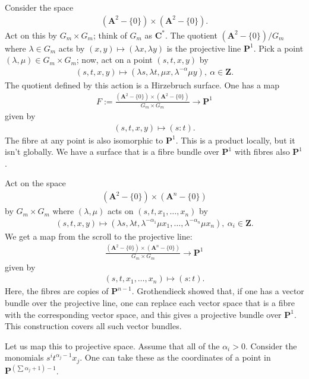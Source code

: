 \documentclass [11 pt, oneside, margin = 1 in] {article}
\begin{document}
\begin{example}\label{}\text{}
Consider the space
\begin{align*}
	(\mathbf{A}^2 - \{0\}) \times (\mathbf{A}^2 - \{0\}).
\end{align*}
Act on this by $G_m\times G_m$; think of $G_m$ as $\mathbf{C}^*$. The quotient $(\mathbf{A}^2 - \{0\})/G_m$ where $\lambda \in G_m$ acts by $(x,y)\longmapsto  (\lambda x,\lambda y)$ is the projective line $\mathbf{P}^1$. Pick a point $(\lambda,\mu)\in  G_m\times G_m$; now, act on a point $(s,t,x,y)$ by
\begin{align*}
	(s,t,x,y)\longmapsto  (\lambda s, \lambda t,\mu x,\lambda^{-\alpha}\mu y),\ \alpha\in  \mathbf{Z}.
\end{align*}
The quotient defined by this action is a Hirzebruch surface. One has a map
\begin{align*}
	F := \frac{(\mathbf{A}^2-\{0\})\times (\mathbf{A}^2-\{0\})}{G_m\times G_m} \longrightarrow \mathbf{P}^1
\end{align*}
given by
\begin{align*}
	(s,t,x,y)\longmapsto  (s:t).
\end{align*}
The fibre at any point is also isomorphic to $\mathbf{P}^1$. This is a product locally, but it isn't globally. We have a surface that is a fibre bundle over $\mathbf{P}^1$ with fibres also $\mathbf{P}^1$.
\end{example}

\begin{example}[Scroll]\label{}\text{}
Act on the space
\begin{align*}
	(\mathbf{A}^2- \{0\}) \times (\mathbf{A}^n - \{0\})
\end{align*}
by $G_m\times G_m$ where $(\lambda,\mu)$ acts on $(s,t,x_1,\hdots, x_n)$ by 
\begin{align*}
	(s,t,x,y)\longmapsto  (\lambda s, \lambda t, \lambda^{-\alpha_1}\mu x_1,\hdots, \lambda^{-\alpha_n}\mu x_n), \ \alpha_i\in \mathbf{Z}.
\end{align*}
We get a map from the scroll to the projective line: 
\begin{align*}
	\frac{(\mathbf{A}^2-\{0\}) \times (\mathbf{A}^n-\{0\})}{G_m\times G_m} \longrightarrow \mathbf{P}^1
\end{align*}
given by
\begin{align*}
	(s,t,x_1,\hdots, x_n) \longmapsto (s:t).
\end{align*}
Here, the fibres are copies of $\mathbf{P}^{n-1}$. Grothendieck showed that, if one has a vector bundle over the projective line,  one can replace each vector space that is a fibre with the corresponding vector space, and this gives a projective bundle over $\mathbf{P}^1$. This construction covers all such vector bundles.

Let us map this to projective space. Assume that all of the $\alpha_i>0$. Consider the monomials $s^it^{\alpha_j-1}x_j$. One can take these as the coordinates of a point in $\mathbf{P}^{\left( \sum_{}^{} \alpha_j+1 \right) - 1}$.
\end{example}
\end{document}
